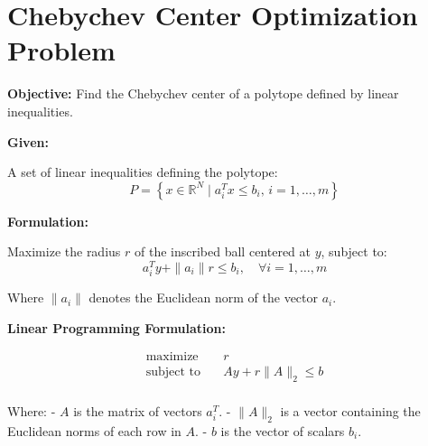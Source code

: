 \documentclass{article}
\begin{document}
\section*{Chebychev Center Optimization Problem}

\textbf{Objective:} Find the Chebychev center of a polytope defined by linear inequalities.

\textbf{Given:}

A set of linear inequalities defining the polytope:
\[
P = \left\{ x \in \mathbb{R}^N \mid a_i^T x \leq b_i, \, i = 1, \ldots, m \right\}
\]

\textbf{Formulation:}

Maximize the radius \( r \) of the inscribed ball centered at \( y \), subject to:
\[
a_i^T y + \|a_i\| r \leq b_i, \quad \forall i = 1, \ldots, m
\]

Where \( \|a_i\| \) denotes the Euclidean norm of the vector \( a_i \).

\textbf{Linear Programming Formulation:}

\[
\begin{align*}
\text{maximize} \quad & r \\
\text{subject to} \quad & A y + r \|A\|_2 \leq b \\
\end{align*}
\]

Where:
- \( A \) is the matrix of vectors \( a_i^T \).
- \( \|A\|_2 \) is a vector containing the Euclidean norms of each row in \( A \).
- \( b \) is the vector of scalars \( b_i \).
\end{document}
